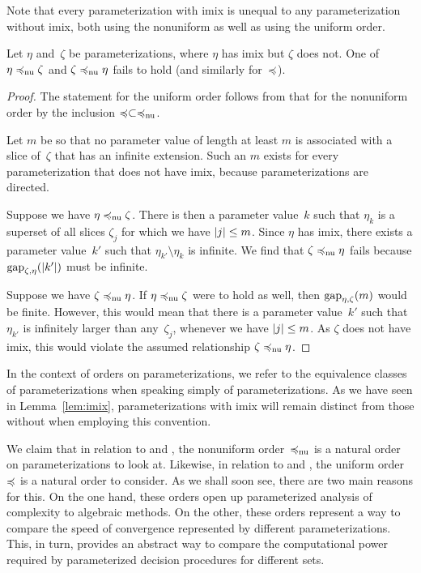 Note that every parameterization with imix is unequal to any parameterization without imix, both using the nonuniform as well as using the uniform order.

\begin{lemma}
\label{lem:imix}%
  Let $\eta$ and~$\zeta$ be parameterizations, where $\eta$ has imix but $\zeta$ does not.
  One of $\eta \preccurlyeq_\mathrm{nu} \zeta$ and $\zeta \preccurlyeq_\mathrm{nu} \eta$ fails to hold (and similarly for~$\preccurlyeq$).
\end{lemma}
\begin{proof}
  The statement for the uniform order follows from that for the nonuniform order by the inclusion $\preccurlyeq \subset \preccurlyeq_\mathrm{nu}$.

  Let $m$ be so that no parameter value of length at least $m$ is associated with a slice of~$\zeta$ that has an infinite extension.
  Such an $m$ exists for every parameterization that does not have imix, because parameterizations are directed.

  Suppose we have $\eta \preccurlyeq_\mathrm{nu} \zeta$.
  There is then a parameter value~$k$ such that $\eta_k$ is a superset of all slices $\zeta_j$ for which we have ${\lvert j\rvert} \le m$.
  Since $\eta$ has imix, there exists a parameter value~$k'$ such that $\eta_{k'} \setminus \eta_k$ is infinite.
  We find that $\zeta \preccurlyeq_\mathrm{nu} \eta$ fails because $\operatorname{gap}_{\zeta, \eta}({\lvert k'\rvert})$ must be infinite.

  Suppose we have $\zeta \preccurlyeq_\mathrm{nu} \eta$.
  If $\eta \preccurlyeq_\mathrm{nu} \zeta$ were to hold as well, then $\operatorname{gap}_{\eta, \zeta}(m)$ would be finite.
  However, this would mean that there is a parameter value~$k'$ such that $\eta_{k'}$ is infinitely larger than any~$\zeta_j$, whenever we have ${\lvert j\rvert} \le m$.
  As $\zeta$ does not have imix, this would violate the assumed relationship $\zeta \preccurlyeq_\mathrm{nu} \eta$.
\end{proof}

In the context of orders on parameterizations, we refer to the equivalence classes of parameterizations when speaking simply of parameterizations.
As we have seen in Lemma~\ref{lem:imix}, parameterizations with imix will remain distinct from those without when employing this convention.

We claim that in relation to  and , the nonuniform order~$\preccurlyeq_\mathrm{nu}$ is a natural order on parameterizations to look at.
Likewise, in relation to  and , the uniform order~$\preccurlyeq$ is a natural order to consider.
As we shall soon see, there are two main reasons for this.
On the one hand, these orders open up parameterized analysis of complexity to algebraic methods.
On the other, these orders represent a way to compare the speed of convergence represented by different parameterizations.
This, in turn, provides an abstract way to compare the computational power required by parameterized decision procedures for different sets.


